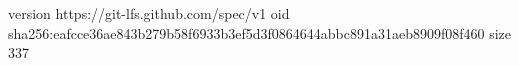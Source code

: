 version https://git-lfs.github.com/spec/v1
oid sha256:eafcce36ae843b279b58f6933b3ef5d3f0864644abbc891a31aeb8909f08f460
size 337
